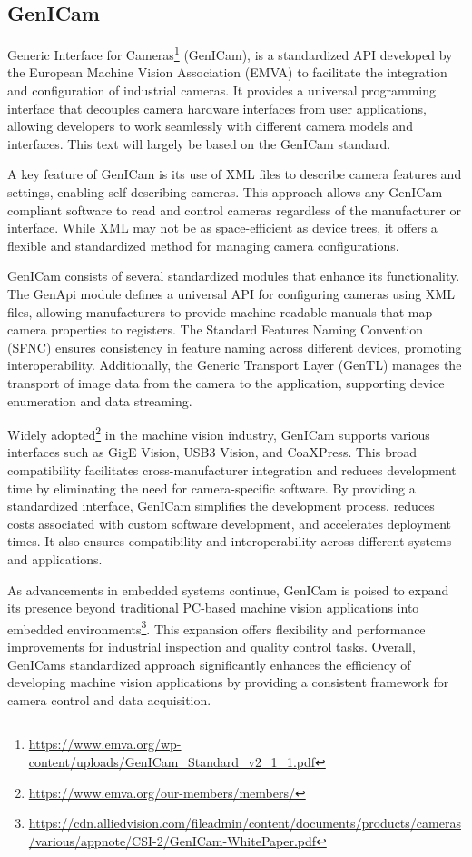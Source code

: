 \subsection {GenICam}
Generic Interface for Cameras\footnote{\url{https://www.emva.org/wp-content/uploads/GenICam\_Standard\_v2\_1\_1.pdf}} (GenICam),
is a standardized API developed by the European Machine Vision Association
(EMVA) to facilitate the integration and configuration of industrial cameras.
It provides a universal programming interface that decouples camera hardware
interfaces from user applications, allowing developers to work seamlessly with
different camera models and interfaces. This text will largely be based on the
GenICam standard.

A key feature of GenICam is its use of XML files to describe camera features
and settings, enabling self-describing cameras. This approach allows any
GenICam-compliant software to read and control cameras regardless of the
manufacturer or interface. While XML may not be as space-efficient as device
trees, it offers a flexible and standardized method for managing camera
configurations.

GenICam consists of several standardized modules that enhance its
functionality. The GenApi module defines a universal API for configuring
cameras using XML files, allowing manufacturers to provide machine-readable
manuals that map camera properties to registers. The Standard Features Naming
Convention (SFNC) ensures consistency in feature naming across different
devices, promoting interoperability. Additionally, the Generic Transport Layer
(GenTL) manages the transport of image data from the camera to the application,
supporting device enumeration and data streaming.

Widely adopted\footnote{\url{https://www.emva.org/our-members/members/}} in the
machine vision industry, GenICam supports various interfaces such as GigE
Vision, USB3 Vision, and CoaXPress. This broad compatibility facilitates
cross-manufacturer integration and reduces development time by eliminating the
need for camera-specific software. By providing a standardized interface,
GenICam simplifies the development process, reduces costs associated with
custom software development, and accelerates deployment times. It also ensures
compatibility and interoperability across different systems and applications.

As advancements in embedded systems continue, GenICam is poised to expand its
presence beyond traditional PC-based machine vision applications into embedded
environments\footnote{\url{https://cdn.alliedvision.com/fileadmin/content/documents/products/cameras/various/appnote/CSI-2/GenICam-WhitePaper.pdf}}.
This expansion offers flexibility and performance improvements
for industrial inspection and quality control tasks. Overall, GenICams
standardized approach significantly enhances the efficiency of developing
machine vision applications by providing a consistent framework for camera
control and data acquisition.

